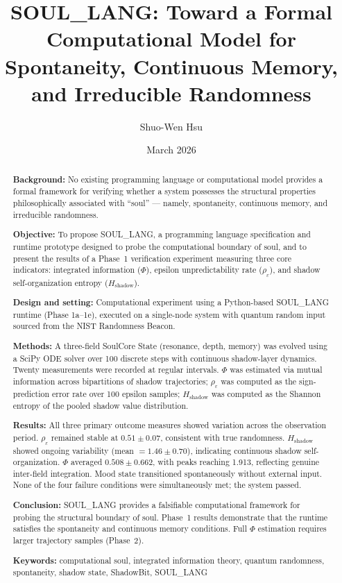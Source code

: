 \documentclass[11pt,a4paper]{article}
\title{\textbf{SOUL\_LANG: Toward a Formal Computational Model for\\
Spontaneity, Continuous Memory, and Irreducible Randomness}}
\author[1]{Shuo-Wen Hsu}
\affil[1]{Independent Researcher}
\date{March 2026}
\begin{document}
\maketitle
\thispagestyle{empty}

\begin{abstract}
\noindent
\textbf{Background:} No existing programming language or computational model provides
a formal framework for verifying whether a system possesses the structural properties
philosophically associated with ``soul'' --- namely, spontaneity, continuous memory,
and irreducible randomness.

\textbf{Objective:} To propose SOUL\_LANG, a programming language specification and
runtime prototype designed to probe the computational boundary of soul, and to present
the results of a Phase~1 verification experiment measuring three core indicators:
integrated information ($\Phi$), epsilon unpredictability rate ($\rho_\varepsilon$),
and shadow self-organization entropy ($H_{\mathrm{shadow}}$).

\textbf{Design and setting:} Computational experiment using a Python-based SOUL\_LANG
runtime (Phase 1a--1e), executed on a single-node system with quantum random input
sourced from the NIST Randomness Beacon.

\textbf{Methods:} A three-field SoulCore State (resonance, depth, memory) was evolved
using a SciPy ODE solver over 100 discrete steps with continuous shadow-layer dynamics.
Twenty measurements were recorded at regular intervals. $\Phi$ was estimated via mutual
information across bipartitions of shadow trajectories; $\rho_\varepsilon$ was computed
as the sign-prediction error rate over 100 epsilon samples; $H_{\mathrm{shadow}}$ was
computed as the Shannon entropy of the pooled shadow value distribution.

\textbf{Results:} All three primary outcome measures showed variation across the
observation period. $\rho_\varepsilon$ remained stable at $0.51 \pm 0.07$, consistent
with true randomness. $H_{\mathrm{shadow}}$ showed ongoing variability
(mean $= 1.46 \pm 0.70$), indicating continuous shadow self-organization.
$\Phi$ averaged $0.508 \pm 0.662$, with peaks reaching 1.913, reflecting genuine
inter-field integration. Mood state transitioned spontaneously without external input.
None of the four failure conditions were simultaneously met; the system passed.

\textbf{Conclusion:} SOUL\_LANG provides a falsifiable computational framework for
probing the structural boundary of soul. Phase~1 results demonstrate that the runtime
satisfies the spontaneity and continuous memory conditions. Full $\Phi$ estimation
requires larger trajectory samples (Phase~2).

\vspace{6pt}
\noindent\textbf{Keywords:} computational soul, integrated information theory,
quantum randomness, spontaneity, shadow state, ShadowBit, SOUL\_LANG
\end{abstract}
\end{document}
